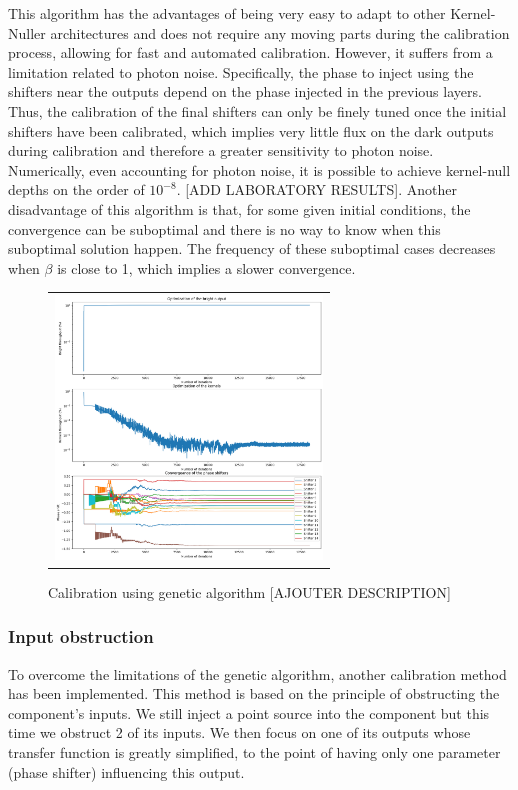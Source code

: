 \documentclass{aa}
\begin{document}
            This algorithm has the advantages of being very easy to adapt to other Kernel-Nuller architectures and does not require any moving parts during the calibration process, allowing for fast and automated calibration. However, it suffers from a limitation related to photon noise. Specifically, the phase to inject using the shifters near the outputs depend on the phase injected in the previous layers. Thus, the calibration of the final shifters can only be finely tuned once the initial shifters have been calibrated, which implies very little flux on the dark outputs during calibration and therefore a greater sensitivity to photon noise. Numerically, even accounting for photon noise, it is possible to achieve kernel-null depths on the order of $10^{-8}$. [ADD LABORATORY RESULTS]. Another disadvantage of this algorithm is that, for some given initial conditions, the convergence can be suboptimal and there is no way to know when this suboptimal solution happen. The frequency of these suboptimal cases decreases when $\beta$ is close to 1, which implies a slower convergence.

            \begin{figure}[H]
                \begin{center}
                \begin{tabular}{c}
                \includegraphics[height=7cm]{img/calibration_genetic.png}
                \end{tabular}
                \end{center}
                \caption[calibration_genetic] 
                { \label{fig:calibration_genetic} 
                Calibration using genetic algorithm [AJOUTER DESCRIPTION]}
            \end{figure}

        \subsubsection{Input obstruction}
            To overcome the limitations of the genetic algorithm, another calibration method has been implemented. This method is based on the principle of obstructing the component's inputs. We still inject a point source into the component but this time we obstruct 2 of its inputs. We then focus on one of its outputs whose transfer function is greatly simplified, to the point of having only one parameter (phase shifter) influencing this output.
\end{document}
